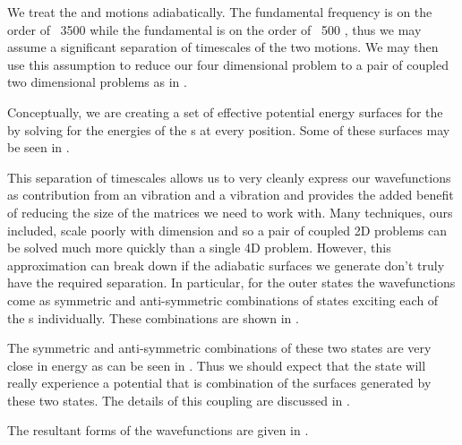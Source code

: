 %
%

We treat the \hplus{} and \htwo{} motions adiabatically. The \htwo{} fundamental frequency is on the order of ~3500 \wavenumbers{} while the \hplus{} fundamental is on the order of ~500 \wavenumbers{}, thus we may assume a significant separation of timescales of the two motions. We may then use this assumption to reduce our four dimensional problem to a pair of coupled two dimensional problems as in .


Conceptually, we are creating a set of effective potential energy surfaces for the \hplus{} by solving for the energies of the \htwo{}s at every \hplus{} position. Some of these surfaces may be seen in .


This separation of timescales allows us to very cleanly express our wavefunctions as contribution from an \hplus{} vibration and a \htwo{} vibration and provides the added benefit of reducing the size of the matrices we need to work with. Many techniques, ours included, scale poorly with dimension and so a pair of coupled 2D problems can be solved much more quickly than a single 4D problem. However, this approximation can break down if the adiabatic surfaces we generate don't truly have the required separation. In particular, for the outer \htwo{} states the wavefunctions come as symmetric and anti-symmetric combinations of states exciting each of the \htwo{}s individually. These combinations are shown in .


The symmetric and anti-symmetric combinations of these two states are very close in energy as can be seen in . Thus we should expect that the \hplus{} state will really experience a potential that is combination of the surfaces generated by these two states. The details of this coupling are discussed in .


The resultant forms of the wavefunctions are given in .


%
